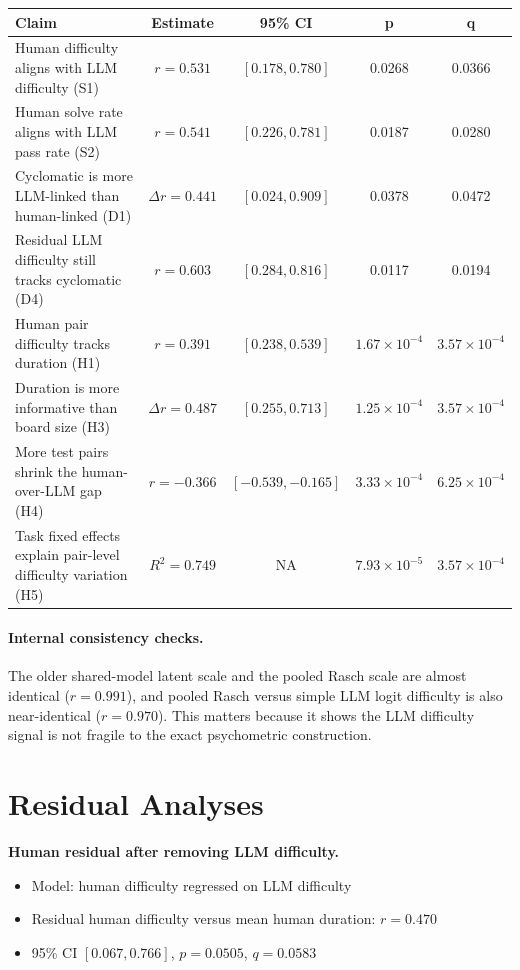 \documentclass[11pt]{article}
\begin{document}
\begin{center}
\small
\begin{tabular}{p{2.8in}cccc}
\toprule
Claim & Estimate & 95\% CI & p & q \\
\midrule
Human difficulty aligns with LLM difficulty (S1) & $r=0.531$ & $[0.178, 0.780]$ & 0.0268 & 0.0366 \\
Human solve rate aligns with LLM pass rate (S2) & $r=0.541$ & $[0.226, 0.781]$ & 0.0187 & 0.0280 \\
Cyclomatic is more LLM-linked than human-linked (D1) & $\Delta r=0.441$ & $[0.024, 0.909]$ & 0.0378 & 0.0472 \\
Residual LLM difficulty still tracks cyclomatic (D4) & $r=0.603$ & $[0.284, 0.816]$ & 0.0117 & 0.0194 \\
Human pair difficulty tracks duration (H1) & $r=0.391$ & $[0.238, 0.539]$ & $1.67\times10^{-4}$ & $3.57\times10^{-4}$ \\
Duration is more informative than board size (H3) & $\Delta r=0.487$ & $[0.255, 0.713]$ & $1.25\times10^{-4}$ & $3.57\times10^{-4}$ \\
More test pairs shrink the human-over-LLM gap (H4) & $r=-0.366$ & $[-0.539, -0.165]$ & $3.33\times10^{-4}$ & $6.25\times10^{-4}$ \\
Task fixed effects explain pair-level difficulty variation (H5) & $R^2=0.749$ & NA & $7.93\times10^{-5}$ & $3.57\times10^{-4}$ \\
\bottomrule
\end{tabular}
\end{center}

\paragraph{Internal consistency checks.}
The older shared-model latent scale and the pooled Rasch scale are almost identical ($r=0.991$), and pooled Rasch versus simple LLM logit difficulty is also near-identical ($r=0.970$). This matters because it shows the LLM difficulty signal is not fragile to the exact psychometric construction.

\section*{Residual Analyses}

\textbf{Human residual after removing LLM difficulty.}

\begin{itemize}
  \item Model: human difficulty regressed on LLM difficulty
  \item Residual human difficulty versus mean human duration: $r = 0.470$
  \item 95\% CI $[0.067, 0.766]$, $p = 0.0505$, $q = 0.0583$
\end{itemize}
\end{document}
